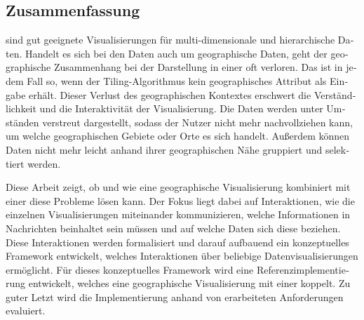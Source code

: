 \begin{otherlanguage}{german}
\chapter*{Zusammenfassung}

\tmaps{} sind gut geeignete Visualisierungen für multi-dimensionale und hierarchische Daten.
Handelt es sich bei den Daten auch um geographische Daten, geht der geographische Zusammenhang bei der Darstellung in einer \tmap{} oft verloren.
Das ist in jedem Fall so, wenn der Tiling-Algorithmus kein geographisches Attribut als Eingabe erhält.
Dieser Verlust des geographischen Kontextes erschwert die Verständlichkeit und die Interaktivität der Visualisierung.
Die Daten werden unter Umständen verstreut dargestellt, sodass der Nutzer nicht mehr nachvollziehen kann, um welche geographischen Gebiete oder Orte es sich handelt.
Außerdem können Daten nicht mehr leicht anhand ihrer geographischen Nähe gruppiert und selektiert werden.

Diese Arbeit zeigt, ob und wie eine geographische Visualisierung kombiniert mit einer \tmap{} diese Probleme lösen kann.
Der Fokus liegt dabei auf Interaktionen, wie die einzelnen Visualisierungen miteinander kommunizieren, welche Informationen in Nachrichten beinhaltet sein müssen und auf welche Daten sich diese beziehen.
Diese Interaktionen werden formalisiert und darauf aufbauend ein konzeptuelles Framework entwickelt, welches Interaktionen über beliebige Datenvisualisierungen ermöglicht.
Für dieses konzeptuelles Framework wird eine Referenzimplementierung entwickelt, welches eine geographische Visualisierung mit einer \tmap{} koppelt.
Zu guter Letzt wird die Implementierung anhand von erarbeiteten Anforderungen evaluiert.

\end{otherlanguage}

